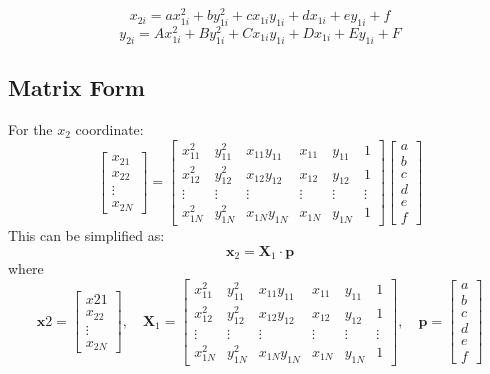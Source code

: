 \documentclass{article}
\begin{document}
\[
x_{2i} = a x_{1i}^2 + b y_{1i}^2 + c x_{1i}y_{1i} + d x_{1i} + e y_{1i} + f
\]
\[
y_{2i} = A x_{1i}^2 + B y_{1i}^2 + C x_{1i}y_{1i} + D x_{1i} + E y_{1i} + F
\]

\subsection*{Matrix Form}
For the \(x_2\) coordinate:
\[
\begin{bmatrix}
x_{21} \\
x_{22} \\
\vdots \\
x_{2N}
\end{bmatrix}
=
\begin{bmatrix}
x_{11}^2 & y_{11}^2 & x_{11}y_{11} & x_{11} & y_{11} & 1 \\
x_{12}^2 & y_{12}^2 & x_{12}y_{12} & x_{12} & y_{12} & 1 \\
\vdots & \vdots & \vdots & \vdots & \vdots & \vdots \\
x_{1N}^2 & y_{1N}^2 & x_{1N}y_{1N} & x_{1N} & y_{1N} & 1
\end{bmatrix}
\begin{bmatrix}
a \\
b \\
c \\
d \\
e \\
f
\end{bmatrix}
\]
This can be simplified as:
\[
\mathbf{x}_2 = \mathbf{X}_1 \cdot \mathbf{p}
\]
where
\[
\mathbf{x}2 = \begin{bmatrix} x{21} \\ x_{22} \\ \vdots \\ x_{2N} \end{bmatrix}, \quad
\mathbf{X}_1 = \begin{bmatrix}
x_{11}^2 & y_{11}^2 & x_{11}y_{11} & x_{11} & y_{11} & 1 \\
x_{12}^2 & y_{12}^2 & x_{12}y_{12} & x_{12} & y_{12} & 1 \\
\vdots & \vdots & \vdots & \vdots & \vdots & \vdots \\
x_{1N}^2 & y_{1N}^2 & x_{1N}y_{1N} & x_{1N} & y_{1N} & 1
\end{bmatrix}, \quad
\mathbf{p} = \begin{bmatrix} a \\ b \\ c \\ d \\ e \\ f \end{bmatrix}
\]
\end{document}
